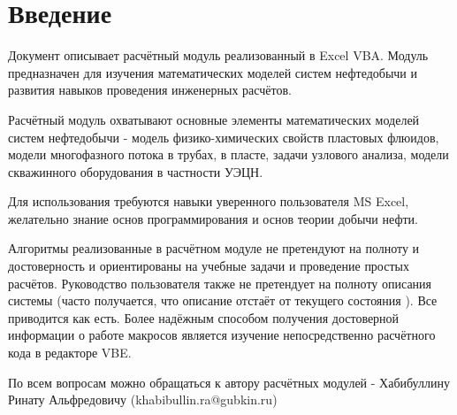 \chapter*{Введение}                         %

Документ описывает расчётный модуль \unf реализованный в Excel VBA. Модуль предназначен для изучения математических моделей систем нефтедобычи и развития навыков проведения инженерных расчётов.

Расчётный модуль охватывают основные элементы математических моделей систем нефтедобычи - модель физико-химических свойств пластовых флюидов, модели многофазного потока в трубах, в пласте, задачи узлового анализа, модели скважинного оборудования в частности УЭЦН.  

Для использования \unf требуются навыки уверенного пользователя MS Excel, желательно знание основ программирования и основ теории добычи нефти. 

Алгоритмы реализованные в расчётном модуле не претендуют на полноту и достоверность и ориентированы на учебные задачи и проведение простых расчётов. Руководство пользователя также не претендует на полноту описания системы (часто получается, что описание отстаёт от текущего состояния \unf). Все приводится как есть. Более надёжным способом получения достоверной информации о работе макросов \unf является изучение непосредственно расчётного кода в редакторе VBE.

По всем вопросам можно обращаться к автору расчётных модулей - Хабибуллину Ринату Альфредовичу (khabibullin.ra@gubkin.ru)  

